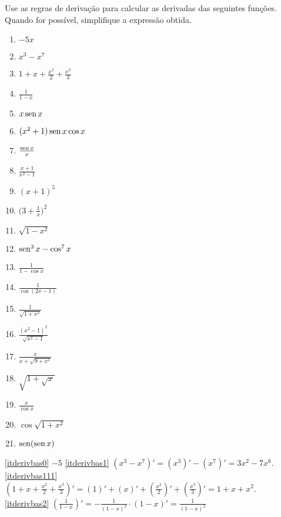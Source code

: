 \begin{exo}
Use as regras de derivação para 
calcular as derivadas das seguintes funções. Quando for possível,
simplifique a expressão obtida.
\begin{multicols}{3}
\begin{enumerate}
\item\label{itderivbas0} $-5x$
\item\label{itderivbas1} $x^3-x^7$
\item\label{itderivbas111} $1+x+\frac{x^2}{2}+\frac{x^3}{3}$
\item\label{itderivbas2} $\frac{1}{1-x}$
\item\label{itderivbas15} $x\operatorname{sen} x$
\item\label{itderivbas151} $(x^2+1)\operatorname{sen} x\cos x$
\item\label{itderivbas3} $\frac{\operatorname{sen} x}{x}$
\item\label{itderivbas4} $\frac{x+1}{x^2-1}$
\item\label{itderivbas1111} $(x+1)^5$
\item\label{itderivbas6} $\big(3+\frac{1}{x}\big)^2$
\item\label{itderivbas5} $\sqrt{1-x^2}$
\item\label{itderivbas7} $\operatorname{sen}^3 x-\cos^7 x$
\item\label{itderivbas8} $\frac{1}{1-\cos x}$
\item\label{itderivbas8meio} $\frac{1}{\cos (2x-1)}$
\item\label{itderivbas9} $\frac{1}{\sqrt{1+x^2}}$
\item\label{itderivbas10} $\frac{(x^2-1)^2}{\sqrt{x^2-1}}$
\item\label{itderivbas11} $\frac{x}{x+\sqrt{9+x^2}}$
\item\label{itderivbas12} $\sqrt{1+\sqrt{x}}$
\item\label{itderivbas16} $\frac{x}{\cos x}$
\item\label{itderivbas17} $\cos\sqrt{1+x^2}$
\item\label{itderivbas18} $\operatorname{sen} (\operatorname{sen} x)$
\end{enumerate}
\end{multicols}
\vspace{0.01cm}
\begin{sol}
\eqref{itderivbas0} $-5$
\eqref{itderivbas1} $(x^3-x^7)'=(x^3)'-(x^7)'=3x^2-7x^6$.
\eqref{itderivbas111}
$(1+x+\frac{x^2}{2}+\frac{x^3}{3})'=(1)'+(x)'+(\frac{x^2}{2})'+(\frac{x^3}{3})'
=1+x+x^2$.
\eqref{itderivbas2}
$(\frac{1}{1-x})'=-\frac{1}{(1-x)^2}\cdot(1-x)'=\frac{1}{(1-x)^2}$

\end{sol}
\end{exo}
